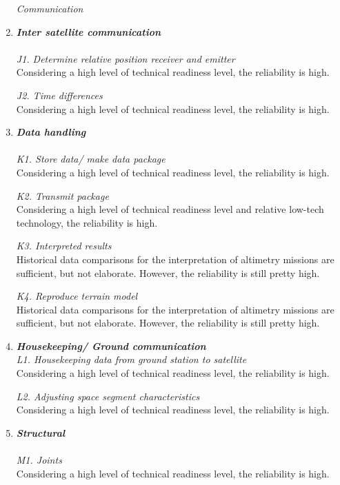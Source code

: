 \begin{enumerate}[A]
\begin{description}
\item[\textit{Communication}]
\end{description}
	\item\textbf{\textit{Inter satellite communication}} \\\\
\textit{J1. Determine relative position receiver and emitter}\\ 
Considering a high level of technical readiness level, the reliability is high.

\textit{J2. Time differences}\\ 
Considering a high level of technical readiness level, the reliability is high.

	\item\textbf{\textit{Data handling}} \\\\
\textit{K1. Store data/ make data package}\\ 
Considering a high level of technical readiness level, the reliability is high.

\textit{K2. Transmit package}\\ 
Considering a high level of technical readiness level and relative low-tech technology, the reliability is high.

\textit{K3. Interpreted results}\\ 
Historical data comparisons for the interpretation of altimetry missions are sufficient, but not elaborate. However, the reliability is still pretty high.

\textit{K4. Reproduce terrain model}\\
Historical data comparisons for the interpretation of altimetry missions are sufficient, but not elaborate. However, the reliability is still pretty high.
 
	\item\textbf{\textit{Housekeeping/ Ground communication}} \\
\textit{L1. Housekeeping data from ground station to satellite}\\ 
Considering a high level of technical readiness level, the reliability is high.

\textit{L2. Adjusting space segment characteristics}\\ 
Considering a high level of technical readiness level, the reliability is high.

	\item\textbf{\textit{Structural}} \\\\
\textit{M1. Joints}\\ 
Considering a high level of technical readiness level, the reliability is high.


\end{enumerate}
